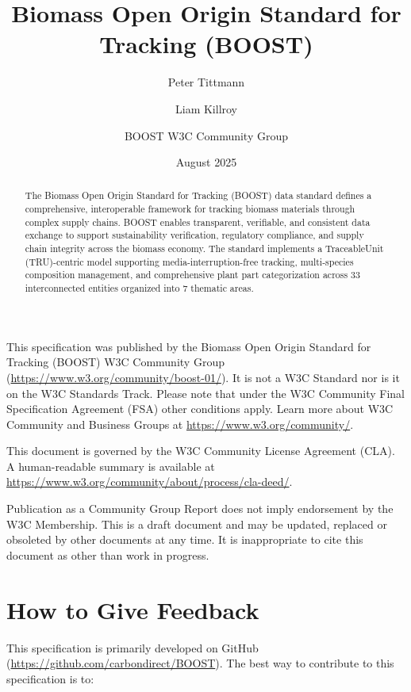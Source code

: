 \documentclass[12pt,a4paper]{article}
\title{Biomass Open Origin Standard for Tracking (BOOST)}
\author{Peter Tittmann \and Liam Killroy \and BOOST W3C Community Group}
\date{August 2025}
\begin{document}

\boosttitle


\newpage
{}

\begin{abstract}
The Biomass Open Origin Standard for Tracking (BOOST) data standard defines a comprehensive, interoperable framework for tracking biomass materials through complex supply chains. BOOST enables transparent, verifiable, and consistent data exchange to support sustainability verification, regulatory compliance, and supply chain integrity across the biomass economy. The standard implements a TraceableUnit (TRU)-centric model supporting media-interruption-free tracking, multi-species composition management, and comprehensive plant part categorization across 33 interconnected entities organized into 7 thematic areas.
\end{abstract}

\begin{w3cstatus}
This specification was published by the Biomass Open Origin Standard for Tracking (BOOST) W3C Community Group (\url{https://www.w3.org/community/boost-01/}). It is not a W3C Standard nor is it on the W3C Standards Track. Please note that under the W3C Community Final Specification Agreement (FSA) other conditions apply. Learn more about W3C Community and Business Groups at \url{https://www.w3.org/community/}.

This document is governed by the W3C Community License Agreement (CLA). A human-readable summary is available at \url{https://www.w3.org/community/about/process/cla-deed/}.

Publication as a Community Group Report does not imply endorsement by the W3C Membership. This is a draft document and may be updated, replaced or obsoleted by other documents at any time. It is inappropriate to cite this document as other than work in progress.
\end{w3cstatus}

\section*{How to Give Feedback}
This specification is primarily developed on GitHub (\url{https://github.com/carbondirect/BOOST}). The best way to contribute to this specification is to:
\end{document}
